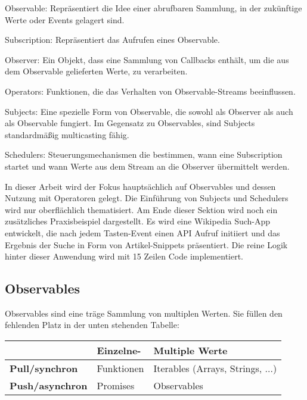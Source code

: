 \begin{description}
    \item Observable: Repräsentiert die Idee einer abrufbaren Sammlung, in der zukünftige Werte oder Events gelagert sind.
    \item Subscription: Repräsentiert das Aufrufen eines Observable.
    \item Observer: Ein Objekt, dass eine Sammlung von Callbacks enthält, um die aus dem Observable gelieferten Werte, zu verarbeiten.
    \item Operators: Funktionen, die das Verhalten von Observable-Streams beeinflussen.
    \item Subjects: Eine spezielle Form von Observable, die sowohl als Observer als auch als Observable fungiert. Im Gegensatz zu Observables, sind Subjects standardmäßig multicasting fähig.
    \item Schedulers: Steuerungsmechanismen die bestimmen, wann eine Subscription startet und wann Werte aus dem Stream an die Observer übermittelt werden.
\end{description}

\noindent
In dieser Arbeit wird der Fokus hauptsächlich auf Observables und dessen Nutzung mit Operatoren gelegt. Die Einführung von Subjects und Schedulers wird nur oberflächlich thematisiert. Am Ende dieser Sektion wird noch ein zusätzliches Praxisbeispiel dargestellt. Es wird eine Wikipedia Such-App entwickelt, die nach jedem Tasten-Event einen API Aufruf initiiert und das Ergebnis der Suche in Form von Artikel-Snippets präsentiert. Die reine Logik hinter dieser Anwendung wird mit 15 Zeilen Code implementiert.

\subsection{Observables}

Observables sind eine träge Sammlung von multiplen Werten. Sie füllen den fehlenden Platz in der unten stehenden Tabelle:

\begin{center}
    \begin{tabular}{| l | l | l |}
    \hline
    & \textbf{Einzelne-} & \textbf{Multiple Werte} \\ \hline
    \textbf{Pull/synchron} & Funktionen & Iterables (Arrays, Strings, ...) \\ \hline
    \textbf{Push/asynchron} & Promises & Observables  \\ \hline
    \end{tabular}
\end{center}

